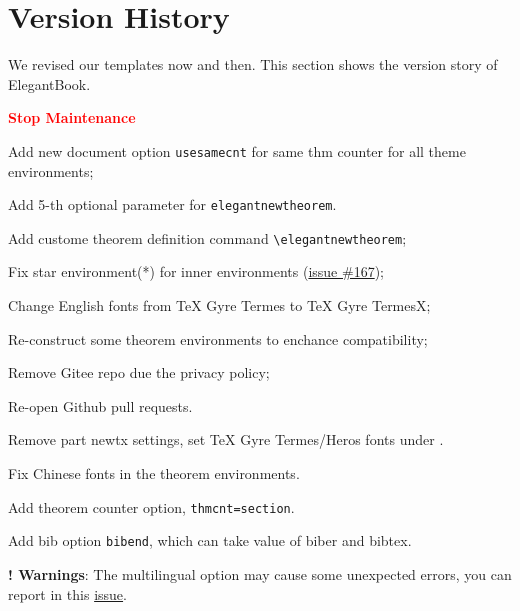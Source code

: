 \documentclass[11pt,bibtex]{elegantbook}
\begin{document}
\chapter{Version History}
We revised our templates now and then. This section shows the version story of ElegantBook.


  \textcolor{red}{\bfseries Stop Maintenance}

\begin{change}
  \item Add new document option \lstinline|usesamecnt| for same thm counter for all theme environments;
  \item Add 5-th optional parameter for \lstinline|elegantnewtheorem|.
\end{change}



\begin{change}
  \item Add custome theorem definition command \lstinline{\elegantnewtheorem};
  \item Fix star environment(*) for inner environments (\href{https://github.com/ElegantLaTeX/ElegantBook/issues/167}{issue \#167});
  \item Change English fonts from TeX Gyre Termes to TeX Gyre TermesX;
  \item Re-construct some theorem environments to enchance compatibility;
  \item Remove Gitee repo due the privacy policy;
  \item Re-open Github pull requests.
\end{change}





\begin{change}
  \item Remove part newtx settings, set TeX Gyre Termes/Heros fonts under .
  \item Fix Chinese fonts in the theorem environments.
  \item Add theorem counter option, \lstinline{thmcnt=section}.
  \item Add bib option \lstinline{bibend}, which can take value of biber and bibtex.
  \item \textbf{! Warnings}: The multilingual option may cause some unexpected errors, you can report in this \href{https://github.com/ElegantLaTeX/ElegantBook/issues/170}{issue}.
\end{change}
\end{document}

